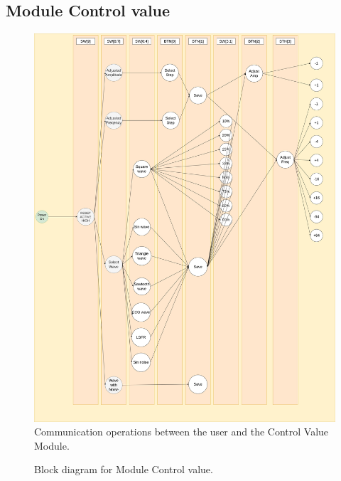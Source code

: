 \subsection{Module Control value}

\begin{figure}[H]
	\centering
	\includegraphics[width=.8\linewidth, height=0.7\textheight]{./../00_spec/spec/UI_task.png}
	\caption{Communication operations between the user and the Control Value Module.}
\end{figure}

\begin{figure}[H]
	\centering
	\caption{Block diagram for Module Control value.}
\end{figure}

